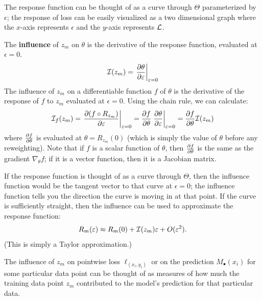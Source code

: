 \documentclass[12pt,twoside]{reedthesis}
\begin{document}
The response function can be thought of as a curve through $\Theta$ parameterized by $\epsilon$; the response of loss can be easily visualized as a two dimensional graph where the $x$-axis represents $\epsilon$ and the $y$-axis represents $\mathcal{L}$.

\begin{definition}
    The \textbf{influence} of $z_m$ on $\theta$ is the derivative of the response function, evaluated at $\epsilon = 0$.
    \begin{equation}
\mathcal{I}(z_m) = \left.\dfrac{\partial{\theta}}{\partial{\varepsilon}}\right|_{\varepsilon = 0}
\end{equation}
The influence of $z_m$ on a differentiable function $f$ of $\theta$ is the derivative of the response of $f$ to $z_m$ evaluated at $\epsilon = 0$. Using the chain rule, we can calculate:
\begin{equation}
    \mathcal{I}_f(z_m) = \left.\dfrac{\partial{(f \circ R_{z_m})}}{\partial{\varepsilon}}\right|_{\varepsilon = 0} = \dfrac{\partial{f}}{\partial{\theta}} \left.\dfrac{\partial{\theta}}{\partial{\varepsilon}}\right|_{\varepsilon = 0} = \dfrac{\partial{f}}{\partial{\theta}} \mathcal{I}(z_m)
\end{equation}
where $\frac{\partial f}{\partial \theta}$ is evaluated at $\theta = R_{z_m}(0)$ (which is simply the value of $\theta$ before any reweighting). Note that if $f$ is a scalar function of $\theta$, then $\frac{\partial f}{\partial \theta}$ is the same as the gradient $\nabla_\theta f$; if it is a vector function, then it is a Jacobian matrix.\cite{bae22}\cite{grosse23}\cite{koh20}
\end{definition}
If the response function is thought of as a curve through $\Theta$, then the influence function would be the tangent vector to that curve at $\epsilon = 0$; the influence function tells you the direction the curve is moving in at that point. If the curve is sufficiently straight, then the influence can be used to approximate the response function:
\begin{equation*}
    R_m(\varepsilon) \approx R_m(0) + \mathcal{I}(z_m)\varepsilon + O(\varepsilon^2).
\end{equation*}
(This is simply a Taylor approximation.)

The influence of $z_m$ on pointwise loss $\ell_{(x_i, y_i)}$ or on the prediction $M_{\bullet}(x_i)$ for some particular data point can be thought of as measures of how much the training data point $z_m$ contributed to the model's prediction for that particular data.

\end{document}
